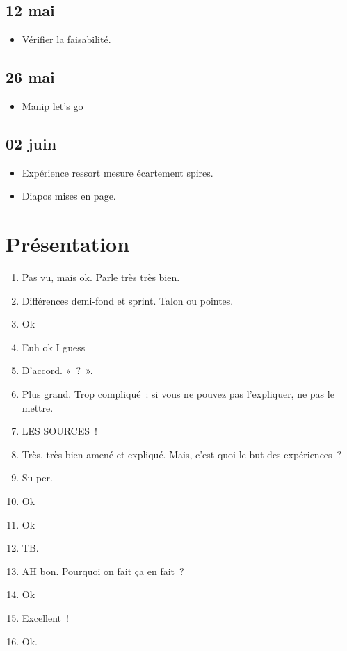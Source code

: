 \documentclass[a4paper, 11pt, final, garamond]{book}
\begin{document}
\subsection{12 mai}
\begin{itemize}
  \item Vérifier la faisabilité.
\end{itemize}

\subsection{26 mai}
\begin{itemize}
  \item Manip let's go
\end{itemize}

\subsection{02 juin}
\begin{itemize}
  \item Expérience ressort mesure écartement spires.
  \item Diapos mises en page.
\end{itemize}

\section{Présentation}

\begin{enumerate}
  \item Pas vu, mais ok. Parle très très bien.
  \item Différences demi-fond et sprint. Talon ou pointes.
  \item Ok
  \item Euh ok I guess
  \item D'accord. «~?~».
  \item Plus grand. Trop compliqué~: si vous ne pouvez pas l'expliquer, ne pas
    le mettre.
  \item LES SOURCES~!
  \item Très, très bien amené et expliqué. Mais, c'est quoi le but des
    expériences~?
  \item Su-per.
  \item Ok
  \item Ok
  \item TB.
  \item AH bon. Pourquoi on fait ça en fait~?
  \item Ok
  \item Excellent~!
  \item Ok.
\end{enumerate}
\end{document}
